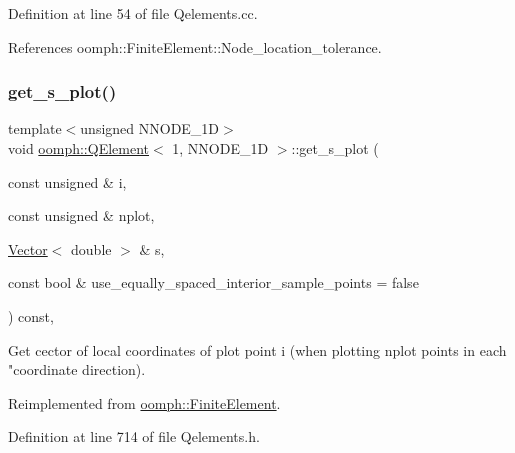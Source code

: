 Definition at line 54 of file Qelements.\+cc.



References oomph\+::\+Finite\+Element\+::\+Node\+\_\+location\+\_\+tolerance.

\mbox{\label{classoomph_1_1QElement_3_011_00_01NNODE__1D_01_4_ae29d39b63e194b5b43c2741e0188a780}} 
\subsubsection{\texorpdfstring{get\+\_\+s\+\_\+plot()}{get\_s\_plot()}}
{\footnotesize\ttfamily template$<$unsigned N\+N\+O\+D\+E\+\_\+1D$>$ \\
void \hyperlink{classoomph_1_1QElement}{oomph\+::\+Q\+Element}$<$ 1, N\+N\+O\+D\+E\+\_\+1D $>$\+::get\+\_\+s\+\_\+plot (\begin{DoxyParamCaption}\item[{const unsigned \&}]{i,  }\item[{const unsigned \&}]{nplot,  }\item[{\hyperlink{classoomph_1_1Vector}{Vector}$<$ double $>$ \&}]{s,  }\item[{const bool \&}]{use\+\_\+equally\+\_\+spaced\+\_\+interior\+\_\+sample\+\_\+points = {\ttfamily false} }\end{DoxyParamCaption}) const\hspace{0.3cm}{\ttfamily [inline]}, {\ttfamily [virtual]}}



Get cector of local coordinates of plot point i (when plotting nplot points in each "coordinate direction). 



Reimplemented from \hyperlink{classoomph_1_1FiniteElement_a82da844fd3ebb2005842464cdc148a03}{oomph\+::\+Finite\+Element}.



Definition at line 714 of file Qelements.\+h.

\mbox{\label{classoomph_1_1QElement_3_011_00_01NNODE__1D_01_4_a932877fb096598bbfc120d2084e2a62f}} 
